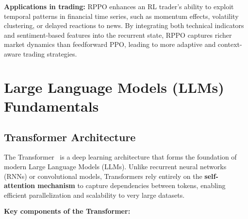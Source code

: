 \documentclass[12pt,a4paper]{report}
\begin{document}
\textbf{Applications in trading:}  
RPPO enhances an RL trader’s ability to exploit temporal patterns in financial time series, such as momentum effects, volatility clustering, or delayed reactions to news. By integrating both technical indicators and sentiment-based features into the recurrent state, RPPO captures richer market dynamics than feedforward PPO, leading to more adaptive and context-aware trading strategies.




\section{Large Language Models (LLMs) Fundamentals}

\subsection{Transformer Architecture}

The Transformer~\cite{vaswani2017attention} is a deep learning architecture that forms the foundation of modern Large Language Models (LLMs). Unlike recurrent neural networks (RNNs) or convolutional models, Transformers rely entirely on the \textbf{self-attention mechanism} to capture dependencies between tokens, enabling efficient parallelization and scalability to very large datasets.

\bigskip
\textbf{Key components of the Transformer:}
\end{document}
